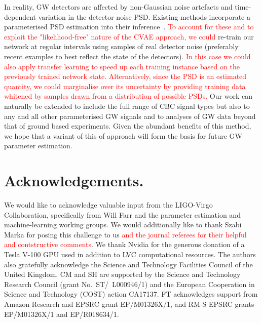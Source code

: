 \documentclass[%
showpacs,
nofootinbib,
 amsmath,amssymb,
 aps,
 twocolumn,
 prl,
 reprint,
floatfix,
]{revtex4-1}
\newcommand{\new}[1]{\textcolor{red}{#1}}
\begin{document}
%
%
In reality, \ac{GW} detectors are affected by non-Gaussian noise artefacts and
time-dependent variation in the detector noise \ac{PSD}. Existing methods
incorporate a parameterised \ac{PSD} estimation into their
inference~\cite{2015PhRvD..91h4034L}. \new{To account for these and to exploit the
"likelihood-free" nature of the \ac{CVAE} approach, we could} re-train our
network at regular intervals using samples of real detector noise (preferably
recent examples to best reflect the state of the detectors). \new{In this case
we could also apply transfer learning to speed up each training instance based
on the previously trained network state.  Alternatively, since the \ac{PSD} is
an estimated quantity, we could marginalise over its uncertainty by providing
training data whitened by samples drawn from a distribution of possible
\acp{PSD}.} Our work can naturally be extended to include the full range of
\ac{CBC} signal types but also to any and all other parameterised \ac{GW}
signals and to analyses of \ac{GW} data beyond that of ground based
experiments. Given the abundant benefits of this method, we hope that a variant
of this of approach will form the basis for future \ac{GW} parameter
estimation.

%
%

%
%
\section{Acknowledgements.}
%
We would like to acknowledge valuable input from the LIGO-Virgo Collaboration,
specifically from Will Farr and the parameter estimation and machine-learning
working groups. We would additionally like to thank Szabi Marka for posing this
challenge to us \new{and the journal referees for their helpful and contstructive
comments}. We thank Nvidia for the generous donation of a Tesla V-100 GPU
used in addition to \ac{LVC} computational resources. The authors also
gratefully acknowledge the Science and Technology Facilities Council of the
United Kingdom. CM and SH are supported by the Science and Technology Research
Council (grant No.~ST/~L000946/1) and the European Cooperation in Science and
Technology (COST) action CA17137. FT acknowledges support from Amazon Research and 
EPSRC grant EP/M01326X/1, and RM-S EPSRC grants EP/M01326X/1 and EP/R018634/1. 

%
%


\end{document}

